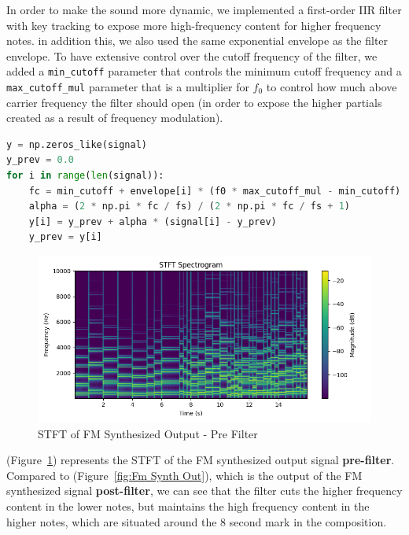 \documentclass[11pt]{article}
\begin{document}
In order to make the sound more dynamic, we implemented a first-order IIR filter with key tracking to expose more high-frequency content for higher frequency notes. in addition this, we also used the same exponential envelope as the filter envelope. To have extensive control over the cutoff frequency of the filter, we added a \texttt{min\_cutoff} parameter that controls the minimum cutoff frequency and a \texttt{max\_cutoff\_mul} parameter that is a multiplier for $f_0$ to control how much above carrier frequency the filter should open (in order to expose the higher partials created as a result of frequency modulation). 

\begin{lstlisting}[language = Python]
y = np.zeros_like(signal)
y_prev = 0.0
for i in range(len(signal)):
    fc = min_cutoff + envelope[i] * (f0 * max_cutoff_mul - min_cutoff)
    alpha = (2 * np.pi * fc / fs) / (2 * np.pi * fc / fs + 1)
    y[i] = y_prev + alpha * (signal[i] - y_prev)
    y_prev = y[i]
\end{lstlisting}

\begin{figure}[H]
    \centering
    \includegraphics[width=1\textwidth]{FM_synth_Pre_Filter.png}
    \caption{STFT of FM Synthesized Output - Pre Filter} %
    \label{fig:Fm Synth Out Pre Filter} %
\end{figure}

(Figure~\ref{fig:Fm Synth Out Pre Filter}) represents the STFT of the FM synthesized output signal \textbf{pre-filter}. Compared to (Figure~\ref{fig:Fm Synth Out}), which is the output of the FM synthesized signal \textbf{post-filter}, we can see that the filter cuts the higher frequency content in the lower notes, but maintains the high frequency content in the higher notes, which are situated around the 8 second mark in the composition. 
\end{document}
